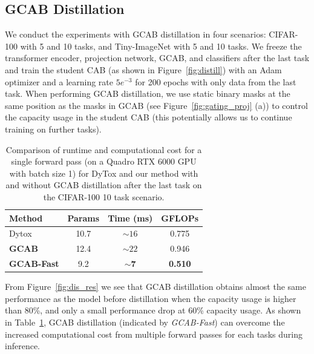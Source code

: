 \documentclass[twocolumn]{svjour3}          %
\begin{document}
\subsection{GCAB Distillation}
\label{sec:distillation-results}

We conduct the experiments with GCAB distillation in four scenarios: CIFAR-100 with 5 and 10 tasks, and Tiny-ImageNet with 5 and 10 tasks. We freeze the transformer encoder, projection network, GCAB, and classifiers after the last task and train the student CAB (as shown in Figure~\ref{fig:distill}) with an Adam optimizer and a learning rate $5e^{-3}$ for 200 epochs with only data from the last task.
When performing GCAB distillation, we use static binary masks at the same position as the masks in GCAB (see Figure~\ref{fig:gating_proj} (a)) to control the capacity usage in the student CAB (this potentially allows us to continue training on further tasks).


\begin{table}
    \centering
    \begin{tabular}{lccc}
    \hline
         \textbf{Method} &\textbf{Params} & \textbf{Time (ms)} & \textbf{GFLOPs} \\
    \hline
        Dytox  &10.7 & $\sim 16$ & 0.775 \\
        \textbf{GCAB} &12.4 & $\sim 22$ & 0.946 \\
        \textbf{GCAB-Fast} &9.2 & $\mathbf{\sim 7}$ &\textbf{0.510} \\
    \hline
    \end{tabular}
    \caption{Comparison of runtime and computational cost for a single forward pass (on a Quadro RTX 6000 GPU with batch size 1) for DyTox and our method with and without GCAB distillation after the last task on the CIFAR-100 10 task scenario.}
    \label{tab:dis}
\end{table}

From Figure~\ref{fig:dis_res} we see that GCAB distillation obtains almost the same performance as the model before distillation when the capacity usage is higher than 80\%, and only a small performance drop at 60\% capacity usage. As shown in Table~\ref{tab:dis}, GCAB distillation (indicated by \emph{GCAB-Fast}) can overcome the increased computational cost from multiple forward passes for each tasks during inference. 
\end{document}
